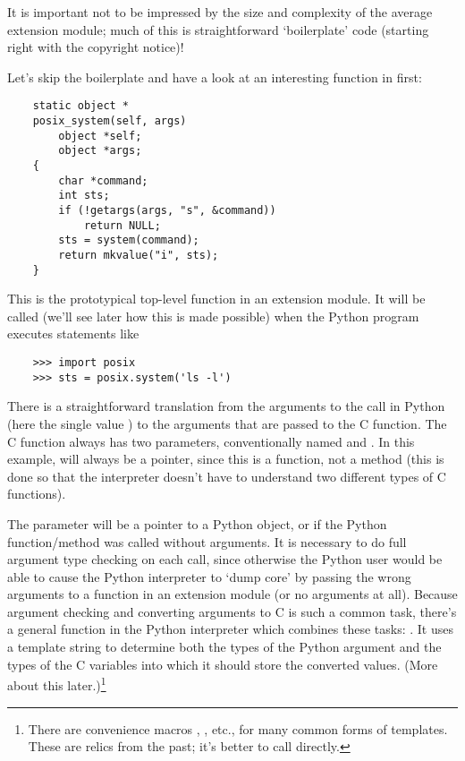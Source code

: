 It is important not to be impressed by the size and complexity of
the average extension module; much of this is straightforward
`boilerplate' code (starting right with the copyright notice)!

Let's skip the boilerplate and have a look at an interesting function
in  first:

\begin{verbatim}
    static object *
    posix_system(self, args)
        object *self;
        object *args;
    {
        char *command;
        int sts;
        if (!getargs(args, "s", &command))
            return NULL;
        sts = system(command);
        return mkvalue("i", sts);
    }
\end{verbatim}

This is the prototypical top-level function in an extension module.
It will be called (we'll see later how this is made possible) when the
Python program executes statements like

\begin{verbatim}
    >>> import posix
    >>> sts = posix.system('ls -l')
\end{verbatim}

There is a straightforward translation from the arguments to the call
in Python (here the single value ) to the arguments that
are passed to the C function.  The C function always has two
parameters, conventionally named  and .  In this
example,  will always be a  pointer, since this is a
function, not a method (this is done so that the interpreter doesn't
have to understand two different types of C functions).

The  parameter will be a pointer to a Python object, or
 if the Python function/method was called without
arguments.  It is necessary to do full argument type checking on each
call, since otherwise the Python user would be able to cause the
Python interpreter to `dump core' by passing the wrong arguments to a
function in an extension module (or no arguments at all).  Because
argument checking and converting arguments to C is such a common task,
there's a general function in the Python interpreter which combines
these tasks: .  It uses a template string to determine
both the types of the Python argument and the types of the C variables
into which it should store the converted values.  (More about this
later.)\footnote{
There are convenience macros ,
, etc., for many common forms of 
templates.  These are relics from the past; it's better to call
 directly.}


